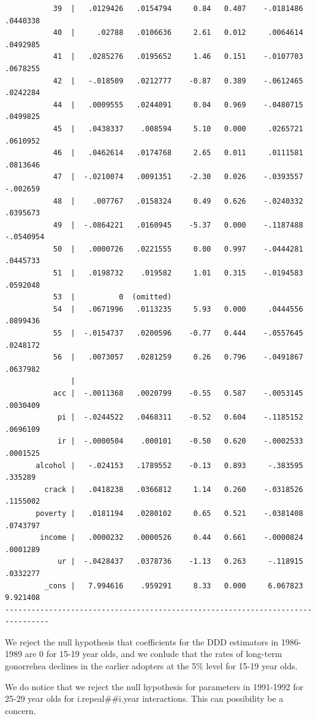 \documentclass[
]{book}
\begin{document}
\begin{verbatim}
           39  |   .0129426   .0154794     0.84   0.407    -.0181486    .0440338
           40  |     .02788   .0106636     2.61   0.012     .0064614    .0492985
           41  |   .0285276   .0195652     1.46   0.151    -.0107703    .0678255
           42  |   -.018509   .0212777    -0.87   0.389    -.0612465    .0242284
           44  |   .0009555   .0244091     0.04   0.969    -.0480715    .0499825
           45  |   .0438337    .008594     5.10   0.000     .0265721    .0610952
           46  |   .0462614   .0174768     2.65   0.011     .0111581    .0813646
           47  |  -.0210074   .0091351    -2.30   0.026    -.0393557    -.002659
           48  |    .007767   .0158324     0.49   0.626    -.0240332    .0395673
           49  |  -.0864221   .0160945    -5.37   0.000    -.1187488   -.0540954
           50  |   .0000726   .0221555     0.00   0.997    -.0444281    .0445733
           51  |   .0198732    .019582     1.01   0.315    -.0194583    .0592048
           53  |          0  (omitted)
           54  |   .0671996   .0113235     5.93   0.000     .0444556    .0899436
           55  |  -.0154737   .0200596    -0.77   0.444    -.0557645    .0248172
           56  |   .0073057   .0281259     0.26   0.796    -.0491867    .0637982
               |
           acc |  -.0011368   .0020799    -0.55   0.587    -.0053145    .0030409
            pi |  -.0244522   .0468311    -0.52   0.604    -.1185152    .0696109
            ir |  -.0000504    .000101    -0.50   0.620    -.0002533    .0001525
       alcohol |   -.024153   .1789552    -0.13   0.893     -.383595     .335289
         crack |   .0418238   .0366812     1.14   0.260    -.0318526    .1155002
       poverty |   .0181194   .0280102     0.65   0.521    -.0381408    .0743797
        income |   .0000232   .0000526     0.44   0.661    -.0000824    .0001289
            ur |  -.0428437   .0378736    -1.13   0.263     -.118915    .0332277
         _cons |   7.994616    .959291     8.33   0.000     6.067823    9.921408
--------------------------------------------------------------------------------
\end{verbatim}

We reject the null hypothesis that coefficients for the DDD estimators in 1986-1989 are 0 for 15-19 year olds, and we conlude that the rates of long-term gonorrehea declines in the earlier adopters at the 5\% level for 15-19 year olds.

We do notice that we reject the null hypothesis for parameters in 1991-1992 for 25-29 year olds for i.repeal\#\#i.year interactions. This can possibility be a concern.
\end{document}
